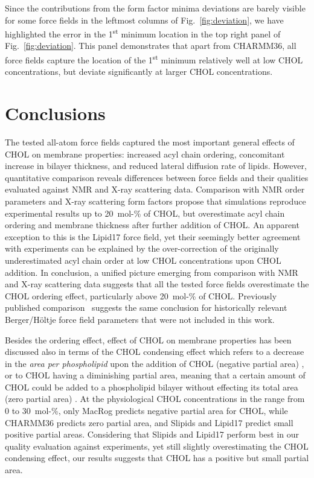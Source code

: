 \documentclass[journal=jctcce]{achemso}
\begin{document}
Since the contributions from the form factor minima deviations are barely visible for some force fields in the leftmost columns of Fig.~\ref{fig:deviation}, we have highlighted the error in the 1\textsuperscript{st} minimum location in the top right panel of Fig.~\ref{fig:deviation}. This panel demonstrates that apart from CHARMM36, all force fields capture the location of the 1\textsuperscript{st} minimum relatively well at low CHOL concentrations, but deviate significantly at larger CHOL concentrations. 

\section{Conclusions}

The tested all-atom force fields captured the most important general effects of CHOL on membrane properties: increased acyl chain ordering, concomitant increase in bilayer thickness, and reduced lateral diffusion rate of lipids. However, quantitative comparison reveals differences between force fields and their qualities evaluated against NMR and X-ray scattering data. Comparison with NMR order parameters and X-ray scattering form factors propose that simulations reproduce experimental results up to 20~mol-\% of CHOL, but overestimate acyl chain ordering and membrane thickness after further addition of CHOL. An apparent exception to this is the Lipid17 force field, yet their seemingly better agreement with experiments can be explained by the over-correction of the originally underestimated acyl chain order at low CHOL concentrations upon CHOL addition. In conclusion, a unified picture emerging from comparison with NMR and X-ray scattering data suggests that all the tested force fields overestimate the CHOL ordering effect, particularly above 20~mol-\% of CHOL. Previously published comparison~\cite{ferreira13} suggests the same conclusion for historically relevant Berger/H{\"o}ltje force field parameters \cite{Berger97,Holtje01} that were not included in this work.

Besides the ordering effect, effect of CHOL on membrane properties has been discussed also in terms of the CHOL condensing effect which refers to a decrease in the \emph{area per phospholipid} upon the addition of CHOL (negative partial area) \cite{edholm2005areas}, or to CHOL having a diminishing partial area, meaning that a certain amount of CHOL could be added to a phospholipid bilayer without effecting its total area (zero partial area) \cite{javanainen2017two}. At the physiological CHOL concentrations in the range from 0 to 30~mol-\%, only MacRog predicts negative partial area for CHOL, while CHARMM36 predicts zero partial area, and Slipids and Lipid17 predict small positive partial areas. Considering that Slipids and Lipid17 perform best in our quality evaluation against experiments, yet still slightly overestimating the CHOL condensing effect, our results suggests that CHOL has a positive but small partial area.
\end{document}
